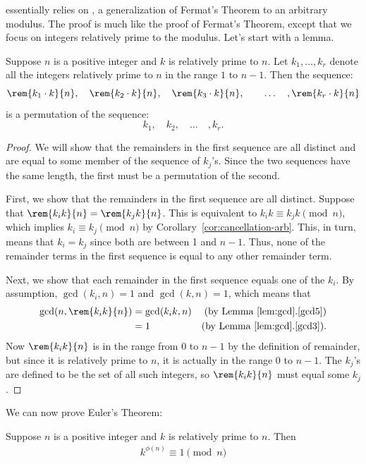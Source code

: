 essentially relies on , a generalization of
Fermat's Theorem to an arbitrary modulus.  The proof is much like the
proof of Fermat's Theorem, except that we focus on integers relatively
prime to the modulus.  Let's start with a lemma.

\begin{lemma}
\label{lem:permutes-arb}
Suppose $n$ is a positive integer and $k$ is relatively prime to $n$.
Let $k_1, \dots, k_r$ denote all the integers relatively prime to $n$
in the range $1$ to $n-1$.  Then the sequence:
%
\[
\rem{k_1 \cdot k}{n},\quad
\rem{k_2 \cdot k}{n},\quad
\rem{k_3 \cdot k}{n},\quad
\quad \dots\quad,
\rem{k_r \cdot k}{n}
\]
%
is a permutation of the sequence:
%
\[
k_1,\quad k_2,\quad \dots\quad, k_r.
\]
\end{lemma}

\begin{proof}
We will show that the remainders in the first sequence are all
distinct and are equal to some member of the sequence of $k_j$'s.
Since the two sequences have the same length, the first must be a
permutation of the second.

First, we show that the remainders in the first sequence are all
distinct.  Suppose that $\rem{k_i k}{n} = \rem{k_j k}{n}$.  This is
equivalent to $k_i k \equiv k_j k \pmod{n}$, which implies $k_i \equiv
k_j \pmod{n}$ by Corollary~\ref{cor:cancellation-arb}.  This, in turn,
means that $k_i = k_j$ since both are between 1 and $n-1$.  Thus, none
of the remainder terms in the first sequence is equal to any other
remainder term.

Next, we show that each remainder in the first sequence equals one of
the $k_i$.  By assumption, $\gcd(k_i, n) = 1$ and $\gcd(k, n) = 1$,
which means that
%
\begin{align*}
\gcd(n, \rem{k_i k}{n}) & = \gcd(k_i k, n)
            & \text{(by Lemma~\ref{lem:gcd}.\ref{gcd5})}\\
      & = 1 & \text{(by Lemma~\ref{lem:gcd}.\ref{gcd3})}.
\end{align*}
%
Now $\rem{k_i k}{n}$ is in the range from 0 to $n - 1$ by the
definition of remainder, but since it is relatively prime to $n$, it
is actually in the range 0 to $n - 1$.  The $k_j$'s are defined to be
the set of all such integers, so $\rem{k_i k}{n}$ must equal some
$k_j$.
\end{proof}

We can now prove Euler's Theorem:

\begin{theorem}
Suppose $n$ is a positive integer and $k$ is relatively prime to $n$.
Then
\begin{eqnarray*}
k^{\phi(n)} \equiv 1 \pmod{n}
\end{eqnarray*}
\end{theorem}

